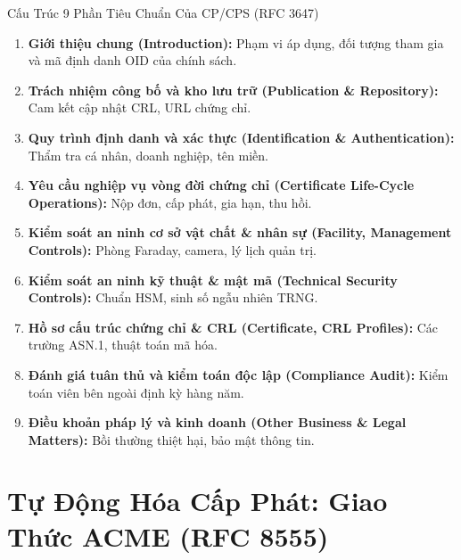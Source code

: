 \begin{frame}{Cấu Trúc 9 Phần Tiêu Chuẩn Của CP/CPS (RFC 3647)}
  \begin{enumerate}\footnotesize
    \item \textbf{Giới thiệu chung (Introduction):} Phạm vi áp dụng, đối tượng tham gia và mã định danh OID của chính sách.
    \item \textbf{Trách nhiệm công bố và kho lưu trữ (Publication \& Repository):} Cam kết cập nhật CRL, URL chứng chỉ.
    \item \textbf{Quy trình định danh và xác thực (Identification \& Authentication):} Thẩm tra cá nhân, doanh nghiệp, tên miền.
    \item \textbf{Yêu cầu nghiệp vụ vòng đời chứng chỉ (Certificate Life-Cycle Operations):} Nộp đơn, cấp phát, gia hạn, thu hồi.
    \item \textbf{Kiểm soát an ninh cơ sở vật chất \& nhân sự (Facility, Management Controls):} Phòng Faraday, camera, lý lịch quản trị.
    \item \textbf{Kiểm soát an ninh kỹ thuật \& mật mã (Technical Security Controls):} Chuẩn HSM, sinh số ngẫu nhiên TRNG.
    \item \textbf{Hồ sơ cấu trúc chứng chỉ \& CRL (Certificate, CRL Profiles):} Các trường ASN.1, thuật toán mã hóa.
    \item \textbf{Đánh giá tuân thủ và kiểm toán độc lập (Compliance Audit):} Kiểm toán viên bên ngoài định kỳ hàng năm.
    \item \textbf{Điều khoản pháp lý và kinh doanh (Other Business \& Legal Matters):} Bồi thường thiệt hại, bảo mật thông tin.
  \end{enumerate}
\end{frame}

\section{Tự Động Hóa Cấp Phát: Giao Thức ACME (RFC 8555)}

